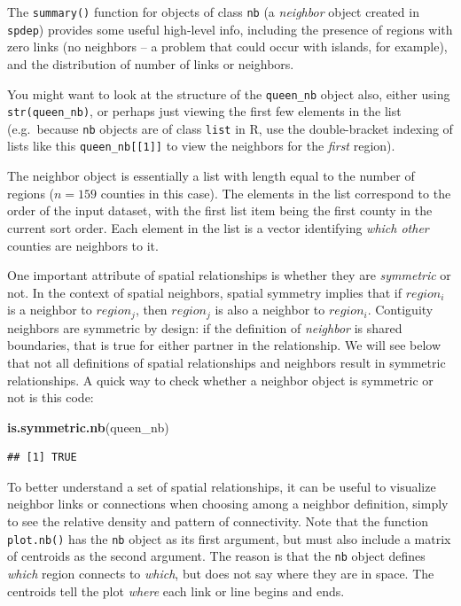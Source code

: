 \documentclass[
]{book}
\newenvironment{Shaded}{\begin{snugshade}}{\end{snugshade}}
\newcommand{\FunctionTok}[1]{\textcolor[rgb]{0.13,0.29,0.53}{\textbf{#1}}}
\newcommand{\NormalTok}[1]{#1}
\begin{document}
The \texttt{summary()} function for objects of class \texttt{nb} (a \emph{neighbor} object created in \texttt{spdep}) provides some useful high-level info, including the presence of regions with zero links (no neighbors -- a problem that could occur with islands, for example), and the distribution of number of links or neighbors.

You might want to look at the structure of the \texttt{queen\_nb} object also, either using \texttt{str(queen\_nb)}, or perhaps just viewing the first few elements in the list (e.g.~because \texttt{nb} objects are of class \texttt{list} in R, use the double-bracket indexing of lists like this \texttt{queen\_nb{[}{[}1{]}{]}} to view the neighbors for the \emph{first} region).

The neighbor object is essentially a list with length equal to the number of regions (\(n=159\) counties in this case). The elements in the list correspond to the order of the input dataset, with the first list item being the first county in the current sort order. Each element in the list is a vector identifying \emph{which other} counties are neighbors to it.

One important attribute of spatial relationships is whether they are \emph{symmetric} or not. In the context of spatial neighbors, spatial symmetry implies that if \(region_i\) is a neighbor to \(region_j\), then \(region_j\) is also a neighbor to \(region_i\). Contiguity neighbors are symmetric by design: if the definition of \emph{neighbor} is shared boundaries, that is true for either partner in the relationship. We will see below that not all definitions of spatial relationships and neighbors result in symmetric relationships. A quick way to check whether a neighbor object is symmetric or not is this code:

\begin{Shaded}
\begin{Highlighting}[]
\FunctionTok{is.symmetric.nb}\NormalTok{(queen\_nb)}
\end{Highlighting}
\end{Shaded}

\begin{verbatim}
## [1] TRUE
\end{verbatim}

To better understand a set of spatial relationships, it can be useful to visualize neighbor links or connections when choosing among a neighbor definition, simply to see the relative density and pattern of connectivity. Note that the function \texttt{plot.nb()} has the \texttt{nb} object as its first argument, but must also include a matrix of centroids as the second argument. The reason is that the \texttt{nb} object defines \emph{which} region connects to \emph{which}, but does not say where they are in space. The centroids tell the plot \emph{where} each link or line begins and ends.
\end{document}
